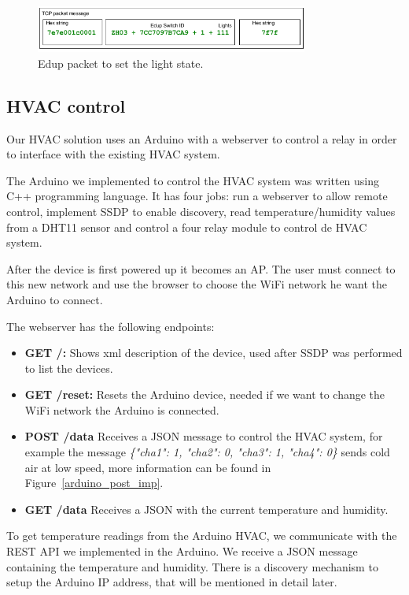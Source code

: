 \begin{figure}[h]
\centering
\includegraphics[width=0.8\textwidth]{Figures/Edup_imp}
\caption{Edup packet to set the light state.}
\label{edup_imp}
\end{figure}



\subsection{HVAC control}

Our HVAC solution uses an Arduino with a webserver to control a relay in order to interface with the existing HVAC system.

The Arduino we implemented to control the HVAC system was written using C++ programming language. It has four jobs: run a webserver to allow remote control, implement \ac{SSDP} to enable discovery, read temperature/humidity values from a DHT11 sensor and control a four relay module to control de HVAC system.

After the device is first powered up it becomes an \ac{AP}. The user must connect to this new network and use the browser to choose the \ac{WiFi} network he want the Arduino to connect.


The webserver has the following endpoints:


\begin{itemize}
  \item \textbf{GET /:} Shows xml description of the device, used after \ac{SSDP} was performed to list the devices.
  \item \textbf{GET /reset:} Resets the Arduino device, needed if we want to change the WiFi network the Arduino is connected.
  \item \textbf{POST /data} Receives a JSON message to control the HVAC system, for example the message \textit{\{"cha1": 1, "cha2": 0, "cha3": 1, "cha4": 0\}} sends cold air at low speed, more information can be found in Figure~\ref{arduino_post_imp}.
  
  \item \textbf{GET /data} Receives a JSON with the current temperature and humidity.
 
\end{itemize}


To get temperature readings from the Arduino \ac{HVAC}, we communicate with the \ac{REST} \ac{API} we implemented in the Arduino. We receive a \ac{JSON} message containing the temperature and humidity. There is a discovery mechanism to setup the Arduino IP address, that will be mentioned in detail later.

